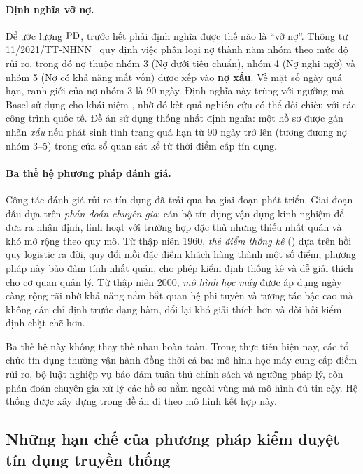 \paragraph{Định nghĩa vỡ nợ.} Để ước lượng $\mathrm{PD}$, trước hết phải định nghĩa được
thế nào là ``vỡ nợ''. Thông tư 11/2021/TT-NHNN~\cite{tt11} quy định việc phân
loại nợ thành năm nhóm theo mức độ rủi ro, trong đó nợ thuộc nhóm 3 (Nợ dưới tiêu
chuẩn), nhóm 4 (Nợ nghi ngờ) và nhóm 5 (Nợ có khả năng mất vốn) được xếp vào
\textbf{nợ xấu}. Về mặt số ngày quá hạn, ranh giới của nợ nhóm 3 là 90 ngày. Định
nghĩa này trùng với ngưỡng mà Basel sử dụng cho khái niệm , nhờ đó
kết quả nghiên cứu có thể đối chiếu với các công trình quốc tế. Đề án sử dụng
thống nhất định nghĩa: một hồ sơ được gán nhãn \textit{xấu} nếu phát sinh tình
trạng quá hạn từ 90 ngày trở lên (tương đương nợ nhóm 3--5) trong cửa sổ quan sát
kể từ thời điểm cấp tín dụng.

\paragraph{Ba thế hệ phương pháp đánh giá.} Công tác đánh giá rủi ro tín dụng đã
trải qua ba giai đoạn phát triển. Giai đoạn đầu dựa trên \textit{phán đoán chuyên
gia}: cán bộ tín dụng vận dụng kinh nghiệm để đưa ra nhận định, linh hoạt với
trường hợp đặc thù nhưng thiếu nhất quán và khó mở rộng theo quy mô. Từ thập niên
1960, \textit{thẻ điểm thống kê} () dựa trên hồi quy logistic ra
đời, quy đổi mỗi đặc điểm khách hàng thành một số điểm; phương pháp này bảo đảm
tính nhất quán, cho phép kiểm định thống kê và dễ giải thích cho cơ quan quản lý.
Từ thập niên 2000, \textit{mô hình học máy} được áp dụng ngày càng rộng rãi nhờ
khả năng nắm bắt quan hệ phi tuyến và tương tác bậc cao mà không cần chỉ định
trước dạng hàm, đổi lại khó giải thích hơn và đòi hỏi kiểm định chặt chẽ hơn.

Ba thế hệ này không thay thế nhau hoàn toàn. Trong thực tiễn hiện nay, các tổ
chức tín dụng thường vận hành đồng thời cả ba: mô hình học máy cung cấp điểm rủi
ro, bộ luật nghiệp vụ bảo đảm tuân thủ chính sách và ngưỡng pháp lý, còn phán
đoán chuyên gia xử lý các hồ sơ nằm ngoài vùng mà mô hình đủ tin cậy. Hệ thống
được xây dựng trong đề án đi theo mô hình kết hợp này.

\subsection{Những hạn chế của phương pháp kiểm duyệt tín dụng truyền thống}
\label{subsec:han-che-truyen-thong}


